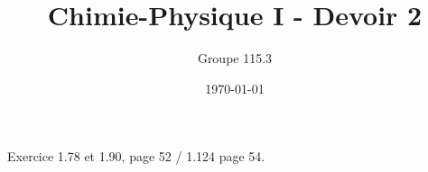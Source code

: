 \documentclass{article}
\title{Chimie-Physique I - Devoir 2}
\author{Groupe 115.3}
\date{\today}
\begin{document}
\maketitle

Exercice 1.78 et 1.90, page 52 / 1.124 page 54.
\end{document}
